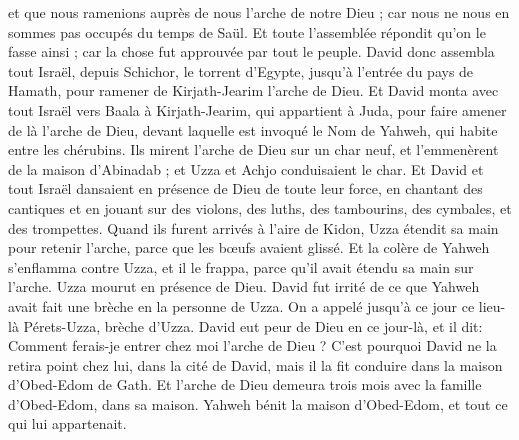 \begin{multicols}{2}
et que nous ramenions auprès de nous l'arche de notre Dieu ; car nous ne nous en sommes pas occupés du temps de Saül.
Et toute l'assemblée répondit qu'on le fasse ainsi ; car la chose fut approuvée par tout le peuple.
David donc assembla tout Israël, depuis Schichor, le torrent d'Egypte, jusqu'à l'entrée du pays de Hamath, pour ramener de Kirjath-Jearim l'arche de Dieu.
Et David monta avec tout Israël vers Baala à Kirjath-Jearim, qui appartient à Juda, pour faire amener de là l'arche de Dieu, devant laquelle est invoqué le Nom de Yahweh, qui habite entre les chérubins.
Ils mirent l'arche de Dieu sur un char neuf, et l'emmenèrent de la maison d'Abinadab ; et Uzza et Achjo conduisaient le char.
Et David et tout Israël dansaient en présence de Dieu de toute leur force, en chantant des cantiques et en jouant sur des violons, des luths, des tambourins, des cymbales, et des trompettes.
Quand ils furent arrivés à l'aire de Kidon, Uzza étendit sa main pour retenir l'arche, parce que les bœufs avaient glissé.
Et la colère de Yahweh s'enflamma contre Uzza, et il le frappa, parce qu'il avait étendu sa main sur l'arche. Uzza mourut en présence de Dieu.
David fut irrité de ce que Yahweh avait fait une brèche en la personne de Uzza. On a appelé jusqu'à ce jour ce lieu-là Pérets-Uzza, brèche d'Uzza.
David eut peur de Dieu en ce jour-là, et il dit: Comment ferais-je entrer chez moi l'arche de Dieu ?
C'est pourquoi David ne la retira point chez lui, dans la cité de David, mais il la fit conduire dans la maison d'Obed-Edom de Gath.
Et l'arche de Dieu demeura trois mois avec la famille d'Obed-Edom, dans sa maison. Yahweh bénit la maison d'Obed-Edom, et tout ce qui lui appartenait.

\end{multicols}
